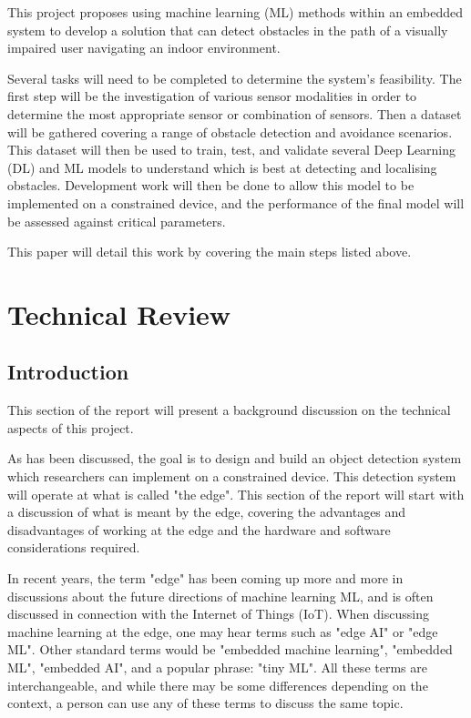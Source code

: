 \documentclass[conference]{IEEEtran}
\begin{document}
This project proposes using machine learning (ML) methods within an embedded system to develop a solution that can detect obstacles in the path of a visually impaired user navigating an indoor environment. 
 
Several tasks will need to be completed to determine the system's feasibility. The first step will be the investigation of various sensor modalities in order to determine the most appropriate sensor or combination of sensors. Then a dataset will be gathered covering a range of obstacle detection and avoidance scenarios. This dataset will then be used to train, test, and validate several Deep Learning (DL) and ML models to understand which is best at detecting and localising obstacles. Development work will then be done to allow this model to be implemented on a constrained device, and the performance of the final model will be assessed against critical parameters. 

This paper will detail this work by covering the main steps listed above. 

\section{Technical Review}
\subsection{Introduction}
This section of the report will present a background discussion on the technical aspects of this project. 

As has been discussed, the goal is to design and build an object detection system which researchers can implement on a constrained device. This detection system will operate at what is called "the edge". This section of the report will start with a discussion of what is meant by the edge, covering the advantages and disadvantages of working at the edge and the hardware and software considerations required. 

In recent years, the term "edge" has been coming up more and more in discussions about the future directions of machine learning ML, and is often discussed in connection with the Internet of Things (IoT). When discussing machine learning at the edge, one may hear terms such as "edge AI" or "edge ML". Other standard terms would be "embedded machine learning", "embedded ML", "embedded AI", and a popular phrase: "tiny ML". All these terms are interchangeable, and while there may be some differences depending on the context, a person can use any of these terms to discuss the same topic.
\end{document}
